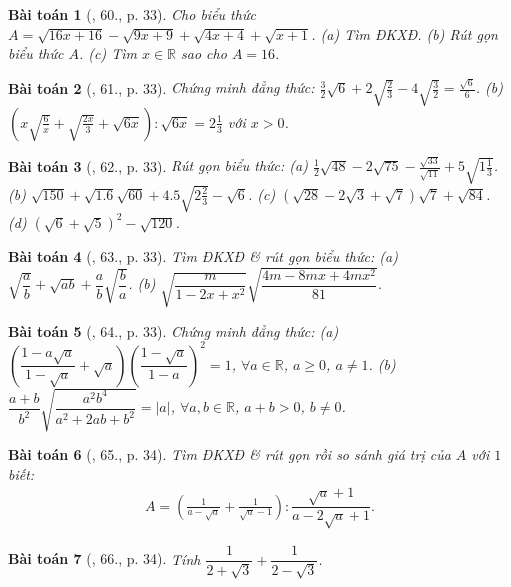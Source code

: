 \documentclass{article}
\newtheorem{baitoan}{Bài toán}
\begin{document}
\begin{baitoan}[\cite{SGK_Toan_9_tap_1}, 60., p. 33]
	Cho biểu thức $A = \sqrt{16x + 16} - \sqrt{9x + 9} + \sqrt{4x + 4} + \sqrt{x + 1}$. (a) Tìm ĐKXĐ. (b) Rút gọn biểu thức $A$. (c) Tìm $x\in\mathbb{R}$ sao cho $A = 16$.
\end{baitoan}

\begin{baitoan}[\cite{SGK_Toan_9_tap_1}, 61., p. 33]
	Chứng minh đẳng thức: $\frac{3}{2}\sqrt{6} + 2\sqrt{\frac{2}{3}} - 4\sqrt{\frac{3}{2}} = \frac{\sqrt{6}}{6}$. (b) $\left(x\sqrt{\frac{6}{x}} + \sqrt{\frac{2x}{3}} + \sqrt{6x}\right):\sqrt{6x} = 2\frac{1}{3}$ với $x > 0$.
\end{baitoan}

\begin{baitoan}[\cite{SGK_Toan_9_tap_1}, 62., p. 33]
	Rút gọn biểu thức: (a) $\frac{1}{2}\sqrt{48} - 2\sqrt{75} - \frac{\sqrt{33}}{\sqrt{11}} + 5\sqrt{1\frac{1}{3}}$. (b) $\sqrt{150} + \sqrt{1.6}\sqrt{60} + 4.5\sqrt{2\frac{2}{3}} - \sqrt{6}$. (c) $(\sqrt{28} - 2\sqrt{3} + \sqrt{7})\sqrt{7} + \sqrt{84}$. (d) $(\sqrt{6} + \sqrt{5})^2 - \sqrt{120}$.
\end{baitoan}

\begin{baitoan}[\cite{SGK_Toan_9_tap_1}, 63., p. 33]
	Tìm ĐKXĐ \& rút gọn biểu thức: (a) $\sqrt{\dfrac{a}{b}} + \sqrt{ab} + \dfrac{a}{b}\sqrt{\dfrac{b}{a}}$. (b) $\sqrt{\dfrac{m}{1 - 2x + x^2}}\sqrt{\dfrac{4m - 8mx + 4mx^2}{81}}$.
\end{baitoan}

\begin{baitoan}[\cite{SGK_Toan_9_tap_1}, 64., p. 33]
	Chứng minh đẳng thức: (a) $\left(\dfrac{1 - a\sqrt{a}}{1 - \sqrt{a}} + \sqrt{a}\right)\left(\dfrac{1 - \sqrt{a}}{1 - a}\right)^2 = 1$, $\forall a\in\mathbb{R}$, $a\ge0$, $a\ne1$. (b) $\dfrac{a + b}{b^2}\sqrt{\dfrac{a^2b^4}{a^2 + 2ab + b^2}} = |a|$, $\forall a,b\in\mathbb{R}$, $a + b > 0$, $b\ne0$.
\end{baitoan}

\begin{baitoan}[\cite{SGK_Toan_9_tap_1}, 65., p. 34]
	Tìm ĐKXĐ \& rút gọn rồi so sánh giá trị của $A$ với $1$ biết:
	\begin{align*}
		 A = \left(\frac{1}{a - \sqrt{a}} + \frac{1}{\sqrt{a} - 1}\right):\dfrac{\sqrt{a} + 1}{a - 2\sqrt{a} + 1}.
	\end{align*}
\end{baitoan}

\begin{baitoan}[\cite{SGK_Toan_9_tap_1}, 66., p. 34]
	Tính $\dfrac{1}{2 + \sqrt{3}} + \dfrac{1}{2 - \sqrt{3}}$.
\end{baitoan}
\end{document}
